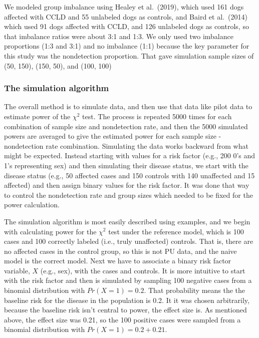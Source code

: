 \documentclass[
]{article}
\begin{document}
We modeled group imbalance using Healey et al.~(2019), which used 161
dogs affected with CCLD and 55 unlabeled dogs as controls, and Baird et
al.~(2014) which used 91 dogs affected with CCLD, and 126 unlabeled dogs
as controls, so that imbalance ratios were about 3:1 and 1:3. We only
used two imbalance proportions (1:3 and 3:1) and no imbalance (1:1)
because the key parameter for this study was the nondetection
proportion. That gave simulation sample sizes of (50, 150), (150, 50),
and (100, 100)

\hypertarget{the-simulation-algorithm}{%
\subsubsection{The simulation
algorithm}\label{the-simulation-algorithm}}

The overall method is to simulate data, and then use that data like
pilot data to estimate power of the \(\chi^2\) test. The process is
repeated 5000 times for each combination of sample size and nondetection
rate, and then the 5000 simulated powers are averaged to give the
estimated power for each sample size - nondetection rate combination.
Simulating the data works backward from what might be expected. Instead
starting with values for a risk factor (e.g., 200 0's and 1's
representing sex) and then simulating their disease status, we start
with the disease status (e.g., 50 affected cases and 150 controls with
140 unaffected and 15 affected) and then assign binary values for the
risk factor. It was done that way to control the nondetection rate and
group sizes which needed to be fixed for the power calculation.

The simulation algorithm is most easily described using examples, and we
begin with calculating power for the \(\chi^2\) test under the reference
model, which is 100 cases and 100 correctly labeled (i.e., truly
unaffected) controls. That is, there are no affected cases in the
control group, so this is not PU data, and the naive model is the
correct model. Next we have to associate a binary risk factor variable,
\(X\) (e.g., sex), with the cases and controls. It is more intuitive to
start with the risk factor and then is simulated by sampling 100
negative cases from a binomial distribution with \(Pr(X=1) = 0.2\). That
probability means the the baseline risk for the disease in the
population is 0.2. It it was chosen arbitrarily, because the baseline
risk isn't central to power, the effect size is. As mentioned above, the
effect size was 0.21, so the 100 positive cases were sampled from a
binomial distribution with \(Pr(X=1) = 0.2 + 0.21\).
\end{document}
